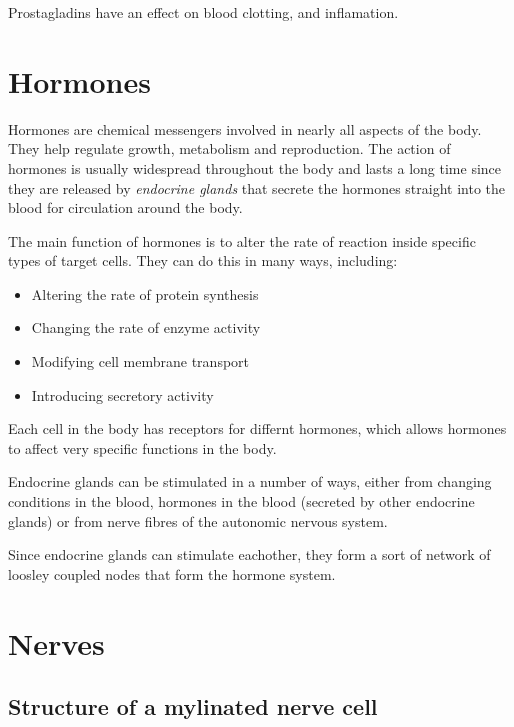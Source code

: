 \documentclass{article}
\begin{document}
Prostagladins have an effect on blood clotting, and inflamation.

\section*{Hormones}

Hormones are chemical messengers involved in nearly all aspects of the body.
They help regulate growth, metabolism and reproduction. The action of hormones
is usually widespread throughout the body and lasts a long time since they are
released by {\it endocrine glands} that secrete the hormones straight into the
blood for circulation around the body.

The main function of hormones is to alter the rate of reaction inside specific
types of target cells. They can do this in many ways, including:


\begin{itemize}

	\item Altering the rate of protein synthesis
	\item Changing the rate of enzyme activity
	\item Modifying cell membrane transport
	\item Introducing secretory activity

\end{itemize}

Each cell in the body has receptors for differnt hormones, which allows hormones
to affect very specific functions in the body.

Endocrine glands can be stimulated in a number of ways, either from changing
conditions in the blood, hormones in the blood (secreted by other endocrine
glands) or from nerve fibres of the autonomic nervous system.

Since endocrine glands can stimulate eachother, they form a sort of network of
loosley coupled nodes that form the hormone system.

\section*{Nerves}

\subsection*{Structure of a mylinated nerve cell}
\end{document}
